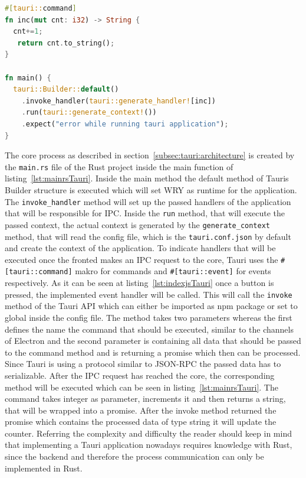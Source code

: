 \begin{lstlisting}[language=Rust,label={lst:mainrsTauri}, caption={Excerpt of main.rs}]
#[tauri::command]
fn inc(mut cnt: i32) -> String {
  cnt+=1;
   return cnt.to_string();
}

fn main() {
  tauri::Builder::default()
    .invoke_handler(tauri::generate_handler![inc])
    .run(tauri::generate_context!())
    .expect("error while running tauri application");
}
\end{lstlisting}
The core process as described in section~\ref{subsec:tauri:architecture} is created by the \texttt{main.rs} file of the Rust project inside the main function of listing~\ref{lst:mainrsTauri}.
Inside the main method the default method of Tauris Builder structure is executed which will set WRY as runtime for the application.
The \texttt{invoke\_handler} method will set up the passed handlers of the application that will be responsible for \ac{IPC}.
Inside the \texttt{run} method, that will execute the passed context, the actual context is generated by the \texttt{generate\_context} method, that will read the config file, which is the \texttt{tauri.conf.json} by default and create the context of the application.
To indicate handlers that will be executed once the fronted makes an \ac{IPC} request to the core, Tauri uses the \texttt{\#[tauri::command]} makro for commands and \texttt{\#[tauri::event]} for events respectively.
As it can be seen at listing~\ref{lst:indexjsTauri} once a button is pressed, the implemented event handler will be called. 
This will call the \texttt{invoke} method of the Tauri \ac{API} which can either be imported as npm package or set to global inside the config file.
The method takes two parameters whereas the first defines the name the command that should be executed, similar to the channels of Electron and the second parameter is containing all data that should
be passed to the command method and is returning a promise which then can be processed.
Since Tauri is using a protocol similar to \ac{JSON-RPC} the passed data has to serializable.
After the \ac{IPC} request has reached the core, the corresponding method will be executed which can be seen in listing~\ref{lst:mainrsTauri}.
The command takes integer as parameter, increments it and then returns a string, that will be wrapped into a promise.
After the invoke method returned the promise which contains the processed data of type string it will update the counter.
Referring the complexity and difficulty the reader should keep in mind that implementing a Tauri application nowadays requires knowledge with Rust, since the backend and therefore the process communication can only be implemented in Rust.
